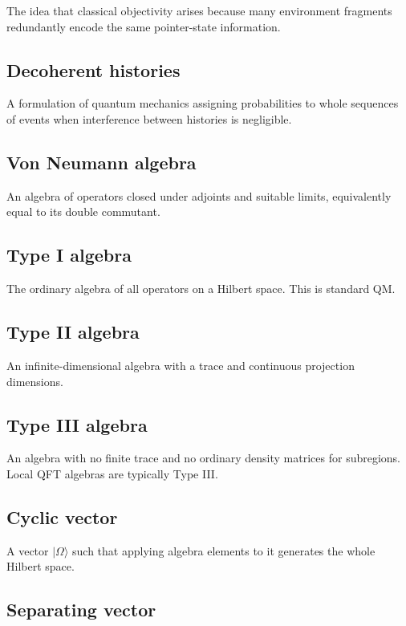 \documentclass[11pt,a4paper]{article}
\begin{document}
The idea that classical objectivity arises because many environment fragments redundantly encode the same pointer-state information.

\subsection{Decoherent histories}

A formulation of quantum mechanics assigning probabilities to whole sequences of events when interference between histories is negligible.

\subsection{Von Neumann algebra}

An algebra of operators closed under adjoints and suitable limits, equivalently equal to its double commutant.

\subsection{Type I algebra}

The ordinary algebra of all operators on a Hilbert space. This is standard QM.

\subsection{Type II algebra}

An infinite-dimensional algebra with a trace and continuous projection dimensions.

\subsection{Type III algebra}

An algebra with no finite trace and no ordinary density matrices for subregions. Local QFT algebras are typically Type III.

\subsection{Cyclic vector}

A vector $|\Omega\rangle$ such that applying algebra elements to it generates the whole Hilbert space.

\subsection{Separating vector}
\end{document}

